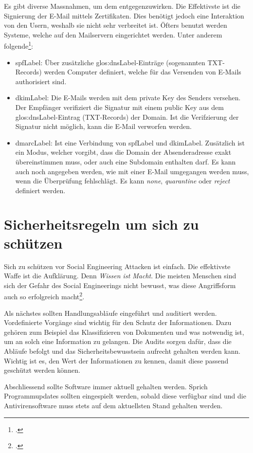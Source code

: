 Es gibt diverse Massnahmen, um dem entgegenzuwirken. Die Effektivste ist die Signierung der E-Mail mittels Zertifikaten. Dies benötigt jedoch eine Interaktion von den Usern, weshalb sie nicht sehr verbreitet ist. Öfters benutzt werden Systeme, welche auf den Mailservern eingerichtet werden. Unter anderem folgende\footcite{sb-spf-dkim-dmarc-demystifiedpdf_2015-06-29}:
\begin{itemize}
\item \Gls{spfLabel}: Über zusätzliche \gls{glos:dnsLabel}-Einträge (sogenannten TXT-Records) werden Computer definiert, welche für das Versenden von E-Mails authorisiert sind.
\item \Gls{dkimLabel}: Die E-Mails werden mit dem private Key des Senders versehen. Der Empfänger verifiziert die Signatur mit einem public Key aus dem \gls{glos:dnsLabel}-Eintrag (TXT-Records) der Domain. Ist die Verifzierung der Signatur nicht möglich, kann die E-Mail verworfen werden.
\item \Gls{dmarcLabel}: Ist eine Verbindung von \Gls{spfLabel} und \Gls{dkimLabel}. Zusätzlich ist ein Modus, welcher vorgibt, dass die Domain der Absenderadresse exakt übereinstimmen muss, oder auch eine Subdomain enthalten darf. Es kann auch noch angegeben werden, wie mit einer E-Mail umgegangen werden muss, wenn die Überprüfung fehlschlägt. Es kann \textit{none}, \textit{quarantine} oder \textit{reject} definiert werden.
\end{itemize}

\section{Sicherheitsregeln um sich zu schützen}
Sich zu schützen vor Social Engineering Attacken ist einfach. Die effektivste Waffe ist die Aufklärung. Denn \textit{Wissen ist Macht}. Die meisten Menschen sind sich der Gefahr des Social Engineerings nicht bewusst, was diese Angriffsform auch so erfolgreich macht\footcite{human_hacking}.

Als nächstes sollten Handlungsabläufe eingeführt und auditiert werden. Vordefinierte Vorgänge sind wichtig für den Schutz der Informationen. Dazu gehören zum Beispiel das Klassifizieren von Dokumenten und was notwendig ist, um an solch eine Information zu gelangen. Die Audits sorgen dafür, dass die Abläufe befolgt und das Sicherheitsbewusstsein aufrecht gehalten werden kann. Wichtig ist es, den Wert der Informationen zu kennen, damit diese passend geschützt werden können.

Abschliessend sollte Software immer aktuell gehalten werden. Sprich Programmupdates sollten eingespielt werden, sobald diese verfügbar sind und die Antivirensoftware muss stets auf dem aktuellsten Stand gehalten werden.